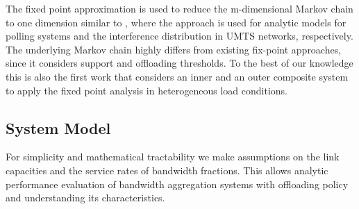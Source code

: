 The fixed point approximation is used to reduce the m-dimensional Markov chain to one dimension similar to \cite{trangia1992polling, staehle2002approximation}, where the approach is used for analytic models for polling systems and the interference distribution in UMTS networks, respectively.
The underlying Markov chain highly differs from existing fix-point approaches, since it considers support and offloading thresholds.
To the best of our knowledge this is also the first work that considers an inner and an outer composite system to apply the fixed point analysis in heterogeneous load conditions.


\subsection{System Model}


For simplicity and mathematical tractability we make assumptions on the link capacities and the service rates of bandwidth fractions. This allows analytic performance evaluation of bandwidth aggregation systems with offloading policy and understanding its characteristics.




